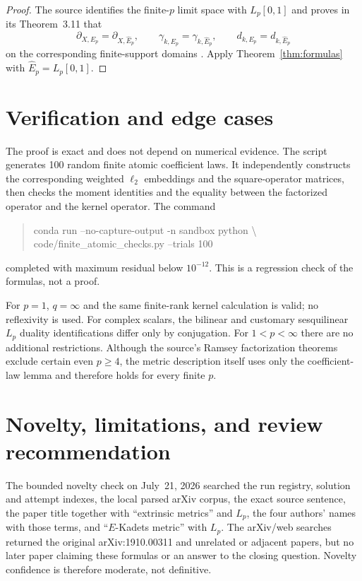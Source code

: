 \documentclass[11pt]{article}
\begin{document}
\begin{proof}
The source identifies the finite-$p$ limit space with $L_p[0,1]$ and proves
in its Theorem~3.11 that
\[
 \partial_{X,E_p}=\partial_{X,\widehat E_p},\qquad
 \gamma_{k,E_p}=\gamma_{k,\widehat E_p},\qquad
 d_{k,E_p}=d_{k,\widehat E_p}
\]
on the corresponding finite-support domains \cite[Theorem~3.11]{source}.
Apply Theorem~\ref{thm:formulas} with $\widehat E_p=L_p[0,1]$.
\end{proof}

\section{Verification and edge cases}

The proof is exact and does not depend on numerical evidence.  The script
 generates 100 random finite atomic
coefficient laws.  It independently constructs the corresponding weighted
$\ell_2$ embeddings and the square-operator matrices, then checks the moment
identities and the equality between the factorized operator and the kernel
operator.  The command
\begin{quote}\small\ttfamily
conda run --no-capture-output -n sandbox python \textbackslash\\
\hspace*{2em}code/finite\_atomic\_checks.py --trials 100
\end{quote}
completed with maximum residual below $10^{-12}$.  This is a regression
check of the formulas, not a proof.

For $p=1$, $q=\infty$ and the same finite-rank kernel calculation is valid;
no reflexivity is used.  For complex scalars, the bilinear and customary
sesquilinear $L_p$ duality identifications differ only by conjugation.  For
$1<p<\infty$ there are no additional restrictions.  Although the source's
Ramsey factorization theorems exclude certain even $p\geq4$, the metric
description itself uses only the coefficient-law lemma and therefore holds
for every finite $p$.

\section{Novelty, limitations, and review recommendation}

The bounded novelty check on July~21, 2026 searched the run registry,
solution and attempt indexes, the local parsed arXiv corpus, the exact source
sentence, the paper title together with ``extrinsic metrics'' and $L_p$, the
four authors' names with those terms, and ``$E$-Kadets metric'' with $L_p$.
The arXiv/web searches returned the original arXiv:1910.00311 and unrelated
or adjacent papers, but no later paper claiming these formulas or an answer
to the closing question.  Novelty confidence is therefore moderate, not
definitive.
\end{document}
